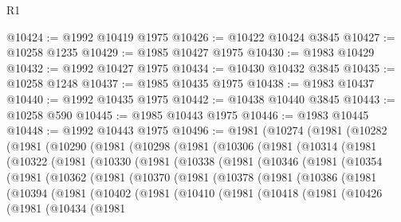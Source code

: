 \begin{lexlean}{R1}
\begin{coremodule}
@10424 := @1992 @10419 @1975
@10426 := @10422 @10424 @3845
@10427 := @10258 @1235
@10429 := @1985 @10427 @1975
@10430 := @1983 @10429
@10432 := @1992 @10427 @1975
@10434 := @10430 @10432 @3845
@10435 := @10258 @1248
@10437 := @1985 @10435 @1975
@10438 := @1983 @10437
@10440 := @1992 @10435 @1975
@10442 := @10438 @10440 @3845
@10443 := @10258 @590
@10445 := @1985 @10443 @1975
@10446 := @1983 @10445
@10448 := @1992 @10443 @1975
@10496 := @1981
    (@10274
      (@1981
        (@10282
          (@1981
            (@10290
              (@1981
                (@10298
                  (@1981
                    (@10306
                      (@1981
                        (@10314
                          (@1981
                            (@10322
                              (@1981
                                (@10330
                                  (@1981
                                    (@10338
                                      (@1981
                                        (@10346
                                          (@1981
                                            (@10354
                                              (@1981
                                                (@10362
                                                  (@1981
                                                    (@10370
                                                      (@1981
                                                        (@10378
                                                          (@1981
                                                            (@10386
                                                              (@1981
                                                                (@10394
                                                                  (@1981
                                                                    (@10402
                                                                      (@1981
                                                                        (@10410
                                                                          (@1981
                                                                            (@10418
                                                                              (@1981
                                                                                (@10426
                                                                                  (@1981
                                                                                    (@10434
                                                                                      (@1981

\end{coremodule}
\end{lexlean}
